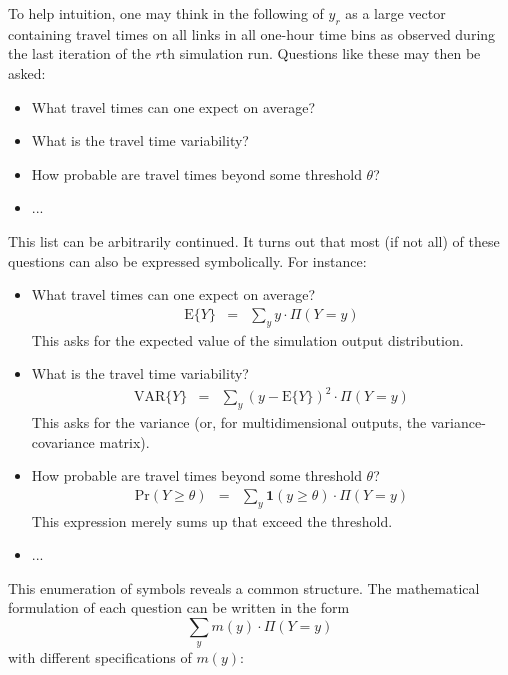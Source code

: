 To help intuition, one may think\corr{,}{} in the following\corr{,}{} of $y_{r}$
as a large vector containing travel times on all links in all one-hour
time bins as observed during the last iteration of the $r$th simulation
run. Questions like these may then be asked:
\begin{itemize}
\item What travel times can one expect on average?
\item What is the travel time variability?
\item How probable are travel times beyond some threshold $\theta$?
\item ...
\end{itemize}
This list can be arbitrarily continued. It turns out that most (if
not all) of these questions can also be expressed symbolically. For
instance:
\begin{itemize}
\item What travel times can one expect on average?
\begin{eqnarray}
\text{E}\{Y\} & = & \sum_{y}y\cdot\Pi(Y=y)\label{eq:question-exp}
\end{eqnarray}
This asks for the expected value of the simulation output distribution.
\item What is the travel time variability?
\begin{eqnarray}
\text{VAR}\{Y\} & = &
\sum_{y}(y-\text{E}\{Y\})^{2}\cdot\Pi(Y=y)\label{eq:question-var}
\end{eqnarray}
This asks for the variance (or, for multidimensional outputs, the
variance-covariance matrix).
\item How probable are travel times beyond some threshold $\theta$?
\begin{eqnarray}
\text{Pr}(Y\geq\theta) & = &
\sum_{y}\mathbf{1}(y\geq\theta)\cdot\Pi(Y=y)\label{eq:question-proba}
\end{eqnarray}
This expression merely sums up  that exceed the threshold.
\item ...
\end{itemize}
%
This enumeration of symbols reveals a common structure. The mathematical
formulation of each question can be written in the form
\begin{equation}
\sum_{y}m(y)\cdot\Pi(Y=y)\label{eq:exp-of-m}
\end{equation}
with different specifications of $m(y)$:

